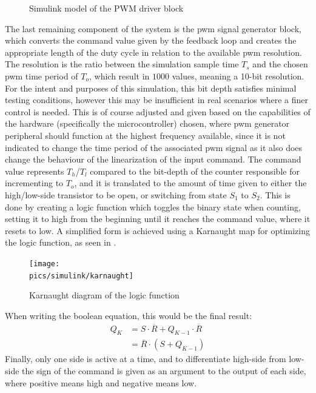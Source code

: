 \begin{figure}[!ht]
    \centering
    \caption{Simulink model of the PWM driver block}
    \label{fig:pwmdriver}
\end{figure}
The last remaining component of the system is the \gls{pwm} signal generator block, which converts the command value given by the feedback loop and creates the appropriate length of the duty cycle in relation to the available \gls{pwm} resolution.
The resolution is the ratio between the simulation sample time $T_s$ and the chosen \gls{pwm} time period of $T_o$, which result in $1000$ values, meaning a 10-bit resolution.
For the intent and purposes of this simulation, this bit depth satisfies minimal testing conditions, however this may be insufficient in real scenarios where a finer control is needed.
This is of course adjusted and given based on the capabilities of the hardware (specifically the microcontroller) chosen, where \gls{pwm} generator peripheral should function at the highest frequency available, since it is not indicated to change the time period of the associated \gls{pwm} signal as it also does change the behaviour of the linearization of the input command.
The command value represents $T_h$/$T_l$ compared to the bit-depth of the counter responsible for incrementing to $T_o$, and it is translated to the amount of time given to either the high/low-side transistor to be open, or switching from state $S_1$ to $S_2$.
This is done by creating a logic function which toggles the binary state when counting, setting it to high from the beginning until it reaches the command value, where it resets to low.
A simplified form is achieved using a Karnaught map for optimizing the logic function, as seen in .
\begin{figure}[!ht]
    \begin{center}\texttt{[image: \\pics/simulink/karnaught]}\end{center}
    \caption{Karnaught diagram of the logic function}
    \label{fig:karnaught}
\end{figure}
When writing the boolean equation, this would be the final result:
\begin{equation}
    \begin{split}
        Q_K &= S \cdot \overline{R} + Q_{K-1} \cdot \overline{R} \\
        &= \overline{R} \cdot (S + Q_{K-1})
    \end{split}
\end{equation}
Finally, only one side is active at a time, and to differentiate high-side from low-side the sign of the command is given as an argument to the output of each side, where positive means high and negative means low.